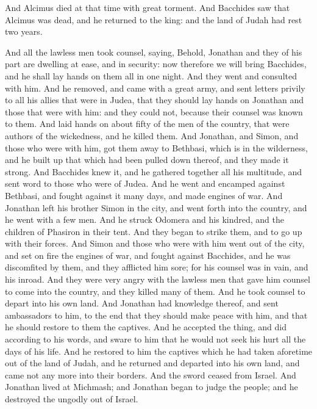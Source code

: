 {And Alcimus died at that time with great torment.
And Bacchides saw that Alcimus was dead, and he returned to the king: and the land of Judah had rest two years.
\par }{\PP {}And all the lawless men took counsel, saying, Behold, Jonathan and they of his part are dwelling at ease, and in security: now therefore we will bring Bacchides, and he shall lay hands on them all in one night.
And they went and consulted with him.
And he removed, and came with a great army, and sent letters privily to all his allies that were in Judea, that they should lay hands on Jonathan and those that were with him: and they could not, because their counsel was known to them.
And
{} laid hands on about fifty of the men of the country, that were authors of the wickedness, and he killed them.
And Jonathan, and Simon, and those who were with him, got them away to Bethbasi, which is in the wilderness, and he built up that which had been pulled down thereof, and they made it strong.
And Bacchides knew it, and he gathered together all his multitude, and sent word to those who were of Judea.
And he went and encamped against Bethbasi, and fought against it many days, and made engines of war.
And Jonathan left his brother Simon in the city, and went forth into the country, and he went with a few men.
And he struck Odomera and his kindred, and the children of Phasiron in their tent.
And they began to strike them, and to go up with their forces. And Simon and those who were with him went out of the city, and set on fire the engines of war,
and fought against Bacchides, and he was discomfited by them, and they afflicted him sore; for his counsel was in vain, and his inroad.
And they were very angry with the lawless men that gave him counsel to come into the country, and they killed many of them. And he took counsel to depart into his own land.
And Jonathan had knowledge thereof, and sent ambassadors to him, to the end that they should make peace with him, and that he should restore to them the captives.
And he accepted the thing, and did according to his words, and sware to him that he would not seek his hurt all the days of his life.
And he restored to him the captives which he had taken aforetime out of the land of Judah, and he returned and departed into his own land, and came not any more into their borders.
And the sword ceased from Israel. And Jonathan lived at Michmash; and Jonathan began to judge the people; and he destroyed the ungodly out of Israel.

}
